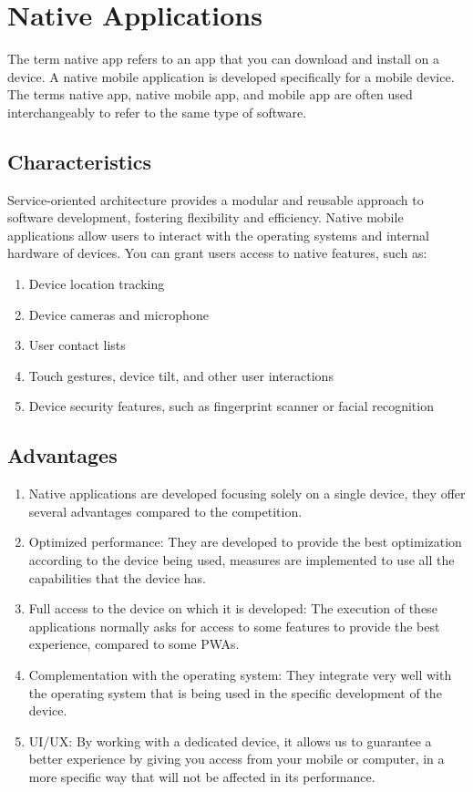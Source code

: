 \documentclass[12pt,a4paper, twosite]{article}
\begin{document}
		\section{Native Applications }
	\label{sec:specific-requirements}
	
	The term native app refers to an app that you can download and install on a device. A native mobile application is developed specifically for a mobile device. The terms native app, native mobile app, and mobile app are often used interchangeably to refer to the same type of software.
	\subsection{Characteristics}
		Service-oriented architecture provides a modular and reusable approach to software development, fostering flexibility and efficiency. 
	\label{sec:product-functions}
	Native mobile applications allow users to interact with the operating systems and internal hardware of devices. You can grant users access to native features, such as:
\begin{enumerate}
	\item Device location tracking
	\item Device cameras and microphone
	\item User contact lists
	\item Touch gestures, device tilt, and other user interactions
	\item Device security features, such as fingerprint scanner or facial recognition
\end{enumerate}
	\subsection{Advantages}
	\label{sec:user-characteristics}
	\begin{enumerate}
		\item Native applications are developed focusing solely on a single device, they offer several advantages compared to the competition.
		
		\item Optimized performance: They are developed to provide the best optimization according to the device being used, measures are implemented to use all the capabilities that the device has.
		
		\item Full access to the device on which it is developed: The execution of these applications normally asks for access to some features to provide the best experience, compared to some PWAs.
		
		\item Complementation with the operating system: They integrate very well with the operating system that is being used in the specific development of the device.
		
		\item UI/UX: By working with a dedicated device, it allows us to guarantee a better experience by giving you access from your mobile or computer, in a more specific way that will not be affected in its performance.
	\end{enumerate}
	
\end{document}
